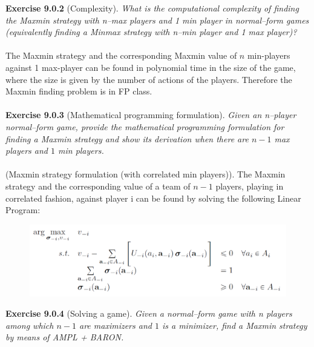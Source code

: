 \noindent
\textbf{Exercise 9.0.2} (Complexity). \textit{What is the computational complexity of finding the Maxmin strategy with n–max players and 1 min player in normal–form games (equivalently finding a Minmax strategy with n–min player and 1 max player)?}\\\\
The Maxmin strategy and the corresponding Maxmin value of $n$ min-players against 1 max-player can be found in polynomial time in the size of the game, where the size is given by the number of actions of the players. Therefore the Maxmin finding problem is in \textsf{FP} class.\\\\
\textbf{Exercise 9.0.3} (Mathematical programming formulation). \textit{Given an n–player normal–form game, provide the mathematical programming formulation for finding a Maxmin strategy and show its derivation when there are $ n-1 $ max players and $ 1 $ min players.}\\\\
(Maxmin strategy formulation (with correlated min players)). The Maxmin strategy and the corresponding value of a team of $n-1$ players, playing in correlated fashion, against player i can be found by solving the following Linear Program:
\begin{figure}[H]
\centering
\includegraphics[width=\textwidth]{images/img_2_9_03.png}
\end{figure}
\noindent
\textbf{Exercise 9.0.4} (Solving a game). \textit{Given a normal–form game with n players among which $ n-1 $ are maximizers and $ 1 $ is a minimizer, find a Maxmin strategy by means of AMPL + BARON.}\\
